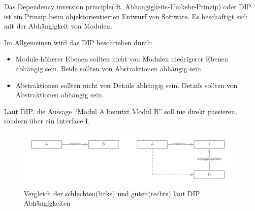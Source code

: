 Das Dependency inversion principle(dt. Abhängigkeits-Umkehr-Prinzip) oder DIP ist ein Prinzip 
beim objektorientierten Entwurf von Software. Es beschäftigt sich mit der Abhängigkeit von Modulen. \cite{DiP}

Im Allgemeinen wird das DIP beschrieben durch:

\begin{itemize}
    \item Module höherer Ebenen sollten nicht von Modulen niedrigerer Ebenen abhängig sein.
    Beide sollten von Abstraktionen abhängig sein.
    \item Abstraktionen sollten nicht von Details abhängig sein.
    Details sollten von Abstraktionen abhängig sein.
\end{itemize}

Laut DIP, die Aussage ``Modul A benutzt Modul B'' soll nie direkt passieren, sondern über ein Interface I.

\begin{figure}[H]
    \centering
    \includegraphics[width=1\textwidth]{./images/DIP - compare.png}
    \caption[Vergleich der schlechten und guten laut DIP Abhängigkeiten]{Vergleich der schlechten(links) und guten(rechts) laut DIP Abhängigkeiten}
    \label{fig:dipCompare}
\end{figure}